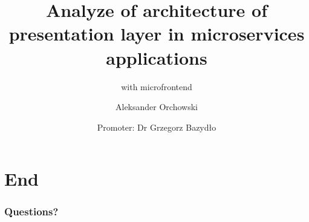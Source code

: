 \documentclass[usenames,dvipsnames]{beamer}
\title{Analyze of architecture of presentation layer in microservices applications}
\subtitle{with microfrontend}
\author{Aleksander Orchowski}
\institute{University of Zielona Góra}
\date{Promoter: Dr Grzegorz Bazydło}
\begin{document}









\section{End}
\begin{frame}[t]
\frametitle{Questions?}
\end{frame}
%
%
%
%
\end{document}
